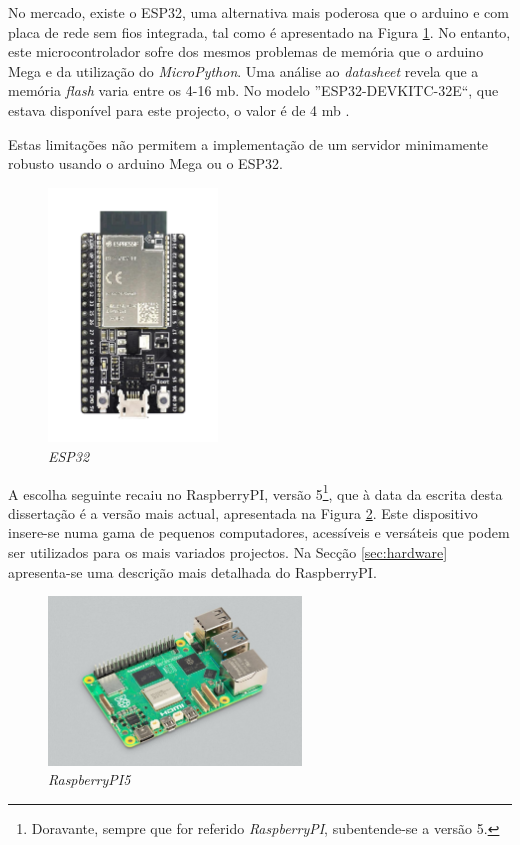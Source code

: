 No mercado, existe o \gls{ESP32}, uma alternativa mais poderosa que o \gls{arduino} e com placa de rede sem fios integrada, tal como é apresentado na Figura \ref{fig:ESP32}. No entanto, este microcontrolador sofre dos mesmos problemas de memória que o \gls{arduino} Mega e da utilização do \textit{MicroPython}. Uma análise ao \textit{datasheet} \cite{esp32datasheet} revela que a memória \textit{flash} varia entre os 4-16 \acrlong{mb}. No modelo ''ESP32-DEVKITC-32E``, que estava disponível para este projecto, o valor é de 4 \acrshort{mb} \cite{diferencaspython}.

Estas limitações não permitem a implementação de um servidor minimamente robusto usando o \gls{arduino} Mega ou o \gls{ESP32}.

\begin{figure}[hbtp]
    \centering
    \includegraphics[width=0.4\textwidth]{figures/ESP32-DevKitC_L_0.png}
    \caption{\textit{ESP32} \cite{ESPDevKit}}
    \label{fig:ESP32}
\end{figure}

A escolha seguinte recaiu no \gls{RaspberryPI}, versão 5\footnote{Doravante, sempre que for referido \textit{RaspberryPI}, subentende-se a versão 5.}, que à data da escrita desta dissertação é a versão mais actual, apresentada na Figura \ref{fig:Raspberrypi5}. Este dispositivo insere-se numa gama de pequenos computadores, acessíveis e versáteis que podem ser utilizados para os mais variados projectos. Na Secção \ref{sec:hardware} apresenta-se uma descrição mais detalhada do \gls{RaspberryPI}.

\begin{figure}[hbtp]
    \centering
    \includegraphics[width=0.6\textwidth]{figures/raspberrypi5.jpg}
    \caption{\textit{RaspberryPI5} \cite{introRaspberrypi5}}
    \label{fig:Raspberrypi5}
\end{figure}

